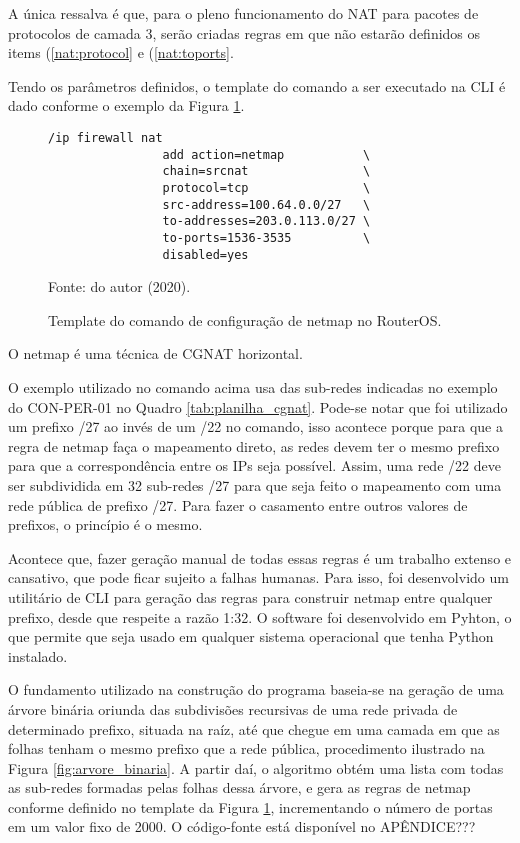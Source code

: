     A única ressalva é que, para o pleno funcionamento do NAT para pacotes de protocolos de camada 3, serão criadas regras em que não estarão definidos os items (\ref{nat:protocol} e (\ref{nat:toports}.

    Tendo os parâmetros definidos, o template do comando a ser executado na CLI é dado conforme o exemplo da Figura \ref{fig:netmap_cli}.

    \begin{figure}[!htb]
        \centering
        \caption{Template do comando de configuração de netmap no RouterOS.} 
        \label{fig:netmap_cli}
        
        \begin{Verbatim}[fontsize=\small]
            /ip firewall nat 
                add action=netmap           \
                chain=srcnat                \
                protocol=tcp                \
                src-address=100.64.0.0/27   \
                to-addresses=203.0.113.0/27 \
                to-ports=1536-3535          \
                disabled=yes
        \end{Verbatim} 

        {\small Fonte: do autor (2020).} 
    \end{figure}

    O netmap é uma técnica de CGNAT horizontal.

    O exemplo utilizado no comando acima usa das sub-redes indicadas no exemplo do CON-PER-01 no Quadro \ref{tab:planilha_cgnat}. Pode-se notar que foi utilizado um prefixo /27 ao invés de um /22 no comando, isso acontece porque para que a regra de netmap faça o mapeamento direto, as redes devem ter o mesmo prefixo para que a correspondência entre os IPs seja possível. Assim, uma rede /22 deve ser subdividida em 32 sub-redes /27 para que seja feito o mapeamento com uma rede pública de prefixo /27. Para fazer o casamento entre outros valores de prefixos, o princípio é o mesmo.
    
    Acontece que, fazer geração manual de todas essas regras é um trabalho extenso e cansativo, que pode ficar sujeito a falhas humanas. Para isso, foi desenvolvido um utilitário de CLI para geração das regras para construir netmap entre qualquer prefixo, desde que respeite a razão 1:32. O software foi desenvolvido em Pyhton, o que permite que seja usado em qualquer sistema operacional que tenha Python instalado.

    O fundamento utilizado na construção do programa baseia-se na geração de uma árvore binária oriunda das subdivisões recursivas de uma rede privada de determinado prefixo, situada na raíz, até que chegue em uma camada em que as folhas tenham o mesmo prefixo que a rede pública, procedimento ilustrado na Figura \ref{fig:arvore_binaria}. A partir daí, o algoritmo obtém uma lista com todas as sub-redes formadas pelas folhas dessa árvore, e gera as regras de netmap conforme definido no template da Figura \ref{fig:netmap_cli}, incrementando o número de portas em um valor fixo de 2000. O código-fonte está disponível no APÊNDICE???

